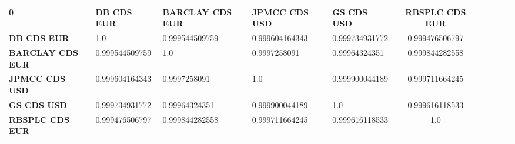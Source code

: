 \begin{center}
 \begin{tabular}{|l|l|l|l|l|c|c|c|c|c|}
\hline
\textbf{0} & \textbf{DB CDS EUR} & \textbf{BARCLAY CDS EUR} & \textbf{JPMCC CDS USD} & \textbf{GS CDS USD} & \textbf{RBSPLC CDS EUR}\\\hhline{|=|=|=|=|=|=|}
\textbf{DB CDS EUR} & 1.0 & 0.999544509759 & 0.999604164343 & 0.999734931772 & 0.999476506797\\
\textbf{BARCLAY CDS EUR} & 0.999544509759 & 1.0 & 0.9997258091 & 0.99964324351 & 0.999844282558\\
\textbf{JPMCC CDS USD} & 0.999604164343 & 0.9997258091 & 1.0 & 0.999900044189 & 0.999711664245\\
\textbf{GS CDS USD} & 0.999734931772 & 0.99964324351 & 0.999900044189 & 1.0 & 0.999616118533\\
\textbf{RBSPLC CDS EUR} & 0.999476506797 & 0.999844282558 & 0.999711664245 & 0.999616118533 & 1.0\\
\hline
\end{tabular}
\end{center}